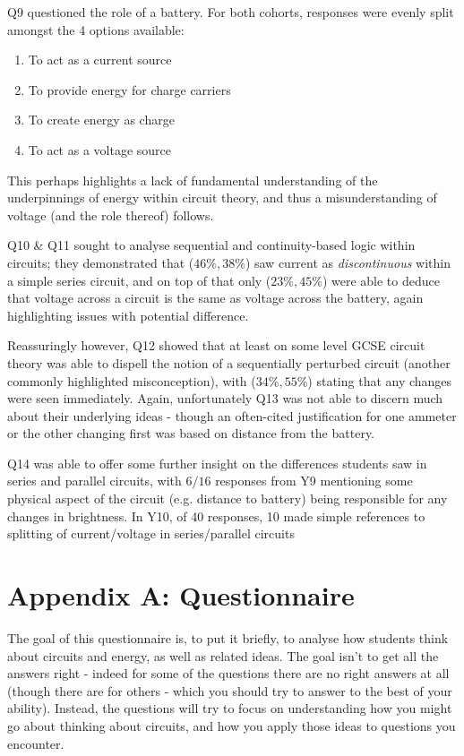 \documentclass[a4paper,openany,nobib]{tufte-book}
\begin{document}
Q9 questioned the role of a battery. For both cohorts, responses were evenly split amongst the 4 options available:
\begin{enumerate}
	\item To act as a current source
	\item To provide energy for charge carriers
	\item To create energy as charge
	\item To act as a voltage source
\end{enumerate}
This perhaps highlights a lack of fundamental understanding of the underpinnings of energy within circuit theory, and thus a misunderstanding of voltage (and the role thereof) follows.

Q10 \& Q11 sought to analyse sequential and continuity-based logic within circuits; they demonstrated that ($46\%,38\%$) saw current as \emph{discontinuous} within a simple series circuit, and on top of that only ($23\%,45\%$) were able to deduce that voltage across a circuit is the same as voltage across the battery, again highlighting issues with potential difference.

Reassuringly however, Q12 showed that at least on some level GCSE circuit theory was able to dispell the notion of a sequentially perturbed circuit (another commonly highlighted misconception), with ($34\%,55\%$) stating that any changes were seen immediately. Again, unfortunately Q13 was not able to discern much about their underlying ideas - though an often-cited justification for one ammeter or the other changing first was based on distance from the battery.


Q14 was able to offer some further insight on the differences students saw in series and parallel circuits, with $6/16 $ responses from Y9 mentioning some physical aspect of the circuit (e.g. distance to battery) being responsible for any changes in brightness. In Y10, of 40 responses, 10 made simple references to splitting of current/voltage in series/parallel circuits
\backmatter
\chapter{Appendix A: Questionnaire}
The goal of this questionnaire is, to put it briefly, to analyse how students think about circuits and energy, as well as related ideas. The goal isn't to get all the answers right - indeed for some of the questions there are no right answers at all (though there are for others - which you should try to answer to the best of your ability). Instead, the questions will try to focus on understanding how you might go about thinking about circuits, and how you apply those ideas to questions you encounter.
\end{document}
